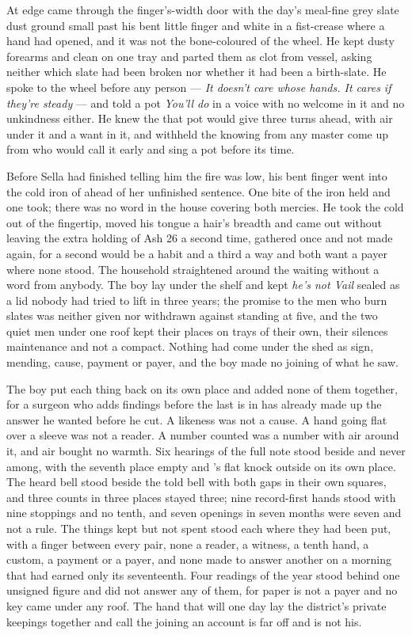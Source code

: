 At  edge  came through the finger's-width door with the day's meal-fine grey slate dust ground small past his bent little finger and white in a fist-crease where a hand had opened, and it was not the bone-coloured  of the wheel. He kept dusty forearms and clean on one tray and parted them as clot from vessel, asking neither which slate had been broken nor whether it had been a birth-slate. He spoke to the wheel before any person --- \emph{It doesn't care whose hands. It cares if they're steady} --- and told a pot \emph{You'll do} in a voice with no welcome in it and no unkindness either. He knew the  that pot would give three turns ahead, with air under it and a want in it, and withheld the knowing from any master come up from  who would call it early and sing a pot before its time.

Before Sella had finished telling him the fire was low, his bent finger went into the cold iron of  ahead of her unfinished sentence. One bite of the iron held and one took; there was no word in the house covering both mercies. He took the cold out of the fingertip, moved his tongue a hair's breadth and came out without leaving the extra holding of Ash 26 a second time, gathered once and not made again, for a second would be a habit and a third a way and both want a payer where none stood. The household straightened around the waiting without a word from anybody. The boy lay under the shelf and kept \emph{he's not Vail} sealed as a lid nobody had tried to lift in three years; the promise to the men who burn slates was neither given nor withdrawn against  standing at five, and the two quiet men under one roof kept their places on trays of their own, their silences maintenance and not a compact. Nothing had come under the shed as sign, mending, cause, payment or payer, and the boy made no joining of what he saw.

The boy put each thing back on its own place and added none of them together, for a surgeon who adds findings before the last is in has already made up the answer he wanted before he cut. A likeness was not a cause. A hand going flat over a sleeve was not a reader. A number counted was a number with air around it, and air bought no warmth. Six hearings of the full note stood beside and never among, with the seventh place empty and 's flat knock outside on its own place. The heard bell stood beside the told bell with both gaps in their own squares, and three counts in three places stayed three; nine record-first hands stood with nine stoppings and no tenth, and seven openings in seven months were seven and not a rule. The things kept but not spent stood each where they had been put, with a finger between every pair, none a reader, a witness, a tenth hand, a custom, a payment or a payer, and none made to answer another on a morning that had earned only its seventeenth. Four readings of the year stood behind one unsigned figure and did not answer any of them, for paper is not a payer and no key came under any roof. The hand that will one day lay the district's private keepings together and call the joining an account is far off and is not his.

